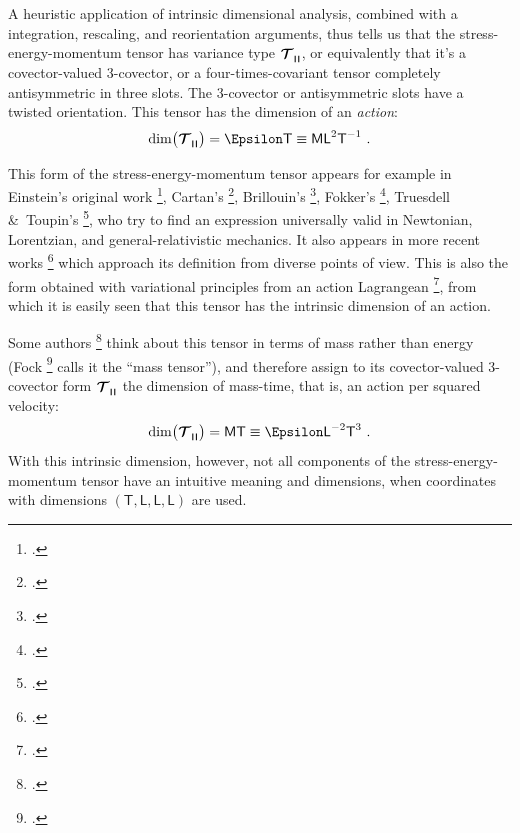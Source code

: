 \documentclass[\ifafour a4paper,12pt,\else a5paper,10pt,\fi%
onecolumn,oneside,article,%
british%
]{memoir}
\makeatletter
\theoremstyle{remark}
\theoremstyle{innote}
\newcommand*{\mathte}[1]{\textbf{\textit{\textsf{#1}}}}
\newcommand*{\citep}{\footcites}
\newcommand*{\amp}{\&}
\renewcommand*{\|}[1][]{\nonscript\,#1\vert\nonscript\;\mathopen{}}
\newcommand*{\sect}{\S}%
\newcommand*{\chap}{ch.}%
\newcommand*{\eg}{{e.g.}}
\newcommand*{\cf}{{cf.}}
\newcommand*{\q}{}%
\DeclareRobustCommand*{\q}{%
  \mathord{\mathpalette\bigcdot@{}}%
}
\newcommand*{\bigcdot@scalefactor}{0.7}
\newcommand*{\bigcdot@widthfactor}{1.5}
\newcommand*{\bigcdot@}[2]{%
  \sbox0{$#1\vcenter{}$}%
  \sbox2{$#1\cdot\m@th$}%
  \hbox to \bigcdot@widthfactor\wd2{%
    \hfil
    \raise\ht0\hbox{%
      \scalebox{\bigcdot@scalefactor}{%
        \lower\ht0\hbox{$#1\bullet\m@th$}%
      }%
    }%
    \hfil
  }%
}
\newcommand*{\Le}{\textsf{L}}
\newcommand*{\Ti}{\textsf{T}}
\newcommand*{\Ma}{\textsf{M}}
\newcommand*{\En}{\Epsilon}%
\newcommand*{\yT}{\bm{\mathcal{T}}}
\renewcommand*{\i}{\indices}
\newcommand*{\rul}{{\mkern2mu\rule[-0.1ex]{0.75pt}{1.1ex}\mkern2mu}}
\DeclarePairedDelimiter\mul{\rul}{\rul}%
\makeatother
\begin{document}
A heuristic application of intrinsic dimensional analysis, combined with a
integration, rescaling, and reorientation arguments, thus tells us that the
stress-energy-momentum tensor has variance type $\yT\i{_{\q\mul{\q\q\q}}}$,
or equivalently that it's a covector-valued 3-covector, or a
four-times-covariant tensor completely antisymmetric in three slots. The
3-covector or antisymmetric slots have a twisted orientation. This tensor
has the dimension of an \emph{action}:
\begin{equation}
    \label{eq:final_dim_T}
  \dim\bigl(\yT\i{_{\q \mul{\q\q\q}}}\bigr) = \En\Ti \equiv \Ma\Le^{2}\Ti^{-1} \ .
\end{equation}


\medskip

This form of the stress-energy-momentum tensor appears for example in
Einstein's original work \citep[\sect~C.9]{einstein1914b}, Cartan's
\citep[\sect~13]{cartan1923}, Brillouin's
\citep[\cf][\sect~7]{brillouin1924}, Fokker's
\citep[\sect~VII.2]{fokker1960_t1965}, Truesdell \amp\ Toupin's
\citep[\sect~F.IV.288]{truesdelletal1960}, who try to find an expression
universally valid in Newtonian, Lorentzian, and general-relativistic
mechanics. It also appears in more recent works
\citep[\chap~14 Exercise~14.18,
\chap~15]{misneretal1970_r1973}{hehletal1986}{gronwaldetal1997}[\cf\
also][]{segev1986,segevetal1999,segev2000,segev2000b,segev2002,kansoetal2007}
which approach its definition from diverse points of view. This is also the
form obtained with variational principles from an action Lagrangean
\citep[\sect~21.3]{misneretal1970_r1973}[\sect~3.3]{hawkingetal1973_r1994}[\sect~IV.55]{pauli1921_t1958}[see
also][\sect~VII.8]{fokker1960_t1965}{gotayetal1992}, from which it is
easily seen that this tensor has the intrinsic dimension of an action.


Some authors
\citep[\eg][\sect~V.55]{fock1955_t1964}[\sect~4.1]{mcvittie1956_r1965}[\sect~10.1]{adleretal1965_r1975}
think about this tensor in terms of mass rather than energy (Fock
\citep[\sect~II.31]{fock1955_t1964} calls it the \enquote{mass tensor}),
and therefore assign to its covector-valued 3-covector form
$\yT\i{_{\q \mul{\q\q\q}}}$ the dimension of mass-time, that is, an action
per squared velocity:
\begin{equation}
  \label{eq:final_dim_T_MT}
  \dim\bigl(\yT\i{_{\q \mul{\q\q\q}}}\bigr) = \Ma\Ti \equiv \En\Le^{-2}\Ti^{3} \ .
\end{equation}
With this intrinsic dimension, however, not all components of the
stress-energy-momentum tensor have an intuitive meaning and dimensions,
when coordinates with dimensions $(\Ti,\Le,\Le,\Le)$ are used.
\end{document}
